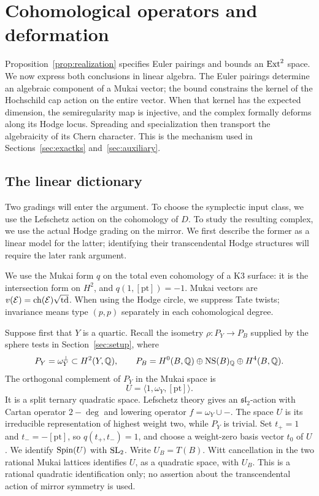 \section{Cohomological operators and deformation}\label{sec:cohomology}

Proposition~\ref{prop:realization} specifies Euler pairings and bounds an
\(\operatorname{Ext}^2\) space.  We now express both conclusions in linear algebra.
The Euler pairings determine an algebraic component of a Mukai vector;
the bound constrains the kernel of the Hochschild cap action on the
entire vector.  When that kernel has the expected dimension, the
semiregularity map is injective, and the complex formally deforms along
its Hodge locus.  Spreading and specialization then transport the
algebraicity of its Chern character.  This is the mechanism used in
Sections~\ref{sec:exactks} and~\ref{sec:auxiliary}.

\subsection{The linear dictionary}

Two gradings will enter the argument.  To choose the symplectic input
class, we use the Lefschetz action on the cohomology of \(D\).  To study
the resulting complex, we use the actual Hodge grading on the mirror.
We first describe the former as a linear model for the latter; identifying
their transcendental Hodge structures will require the later rank argument.

We use the Mukai form \(q\) on the total even cohomology of a K3
surface: it is the intersection form on \(H^2\), and
\(q(1,[\mathrm{pt}])=-1\).  Mukai vectors are
\(v(\mathcal E)=\operatorname{ch}(\mathcal E)\sqrt{\operatorname{td}}\).
When using the Hodge circle, we suppress Tate twists; invariance means
type \((p,p)\) separately in each cohomological degree.

Suppose first that \(Y\) is a quartic.  Recall the isometry
\(\rho:P_Y\longrightarrow P_B\) supplied by the sphere tests in
Section~\ref{sec:setup}, where
\[
 P_Y=\omega_Y^\perp\subset H^2(Y,\mathbb Q),\qquad
 P_B=H^0(B,\mathbb Q)\oplus\operatorname{NS}(B)_\mathbb Q\oplus H^4(B,\mathbb Q).
\]
The orthogonal complement of \(P_Y\) in the Mukai space is
\[
 U=\langle 1,\omega_Y,[\mathrm{pt}]\rangle.
\]
It is a split ternary quadratic space.  Lefschetz theory gives an
\(\mathfrak{sl}_2\)-action with Cartan operator \(2-\deg\) and lowering
operator \(f=\omega_Y\cup-\).  The space \(U\) is its irreducible
representation of highest weight two, while \(P_Y\) is trivial.
Set \(t_+=1\) and \(t_-=-[\mathrm{pt}]\), so
\(q(t_+,t_-)=1\), and choose a weight-zero basis vector \(t_0\) of
\(U\).  We identify \(\operatorname{Spin}(U)\) with \(\operatorname{SL}_2\).
Write \(U_B=T(B)\).  Witt cancellation in the two rational Mukai lattices
identifies \(U\), as a quadratic space, with \(U_B\).
This is a rational quadratic identification only; no assertion about
the transcendental action of mirror symmetry is used.

